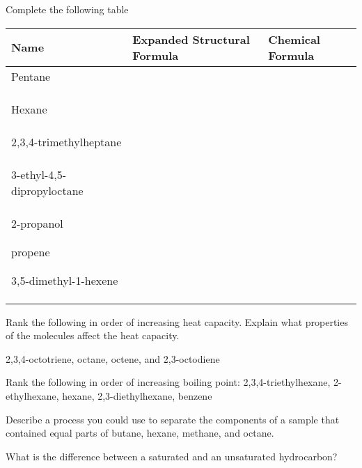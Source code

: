 \documentclass[addpoints, 12pt]{exam}
\begin{document}
\begin{questions}
\question[25] Complete the following table

\begin{tabular}{l|l|l}
Name & Expanded Structural Formula & Chemical Formula \\
\hline
Pentane & & \\
 & & \\
 & & \\
 & & \\
\hline
Hexane & & \\
& & \\ & & \\ & & \\ \hline
2,3,4-trimethylheptane & & \\
& & \\ & & \\ & & \\ \hline
3-ethyl-4,5-dipropyloctane & & \\
& & \\ & & \\ & & \\ \hline
2-propanol
& & \\ & & \\ & & \\ \hline
propene
& & \\ & & \\ & & \\ \hline
3,5-dimethyl-1-hexene & & \\
& & \\ & & \\ & & \\ \hline
\end{tabular}


\question[5] Rank the following in order of increasing heat capacity.
Explain what properties of the molecules affect the heat capacity.

2,3,4-octotriene, octane, octene, and 2,3-octodiene
\vspace{1cm}

\question[5] Rank the following in order of increasing boiling point:
2,3,4-triethylhexane, 2-ethylhexane, hexane, 2,3-diethylhexane, benzene 
\newpage


\question[5] Describe a process you could use to separate the components
of a sample that contained equal parts of butane, hexane, methane, and
octane.
\vspace{1cm}

\question[5] What is the difference between a saturated and an
unsaturated hydrocarbon?


\end{questions}
\end{document}
